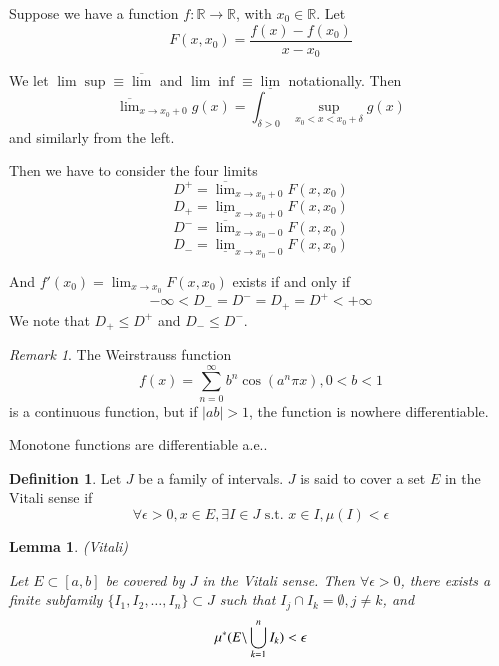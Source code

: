 \documentclass[11pt,a4paper]{report}
\newtheorem{lemma}[theorem]{Lemma}
\theoremstyle{plain}
\theoremstyle{definition}
\newtheorem*{defn}{Definition}
\theoremstyle{remark}
\newtheorem*{rem}{Remark}
\newcommand{\intersection}{\cap}
\newcommand{\Union}{\bigcup}
\newcommand{\R}{\mathbb{R}}
\newcommand{\abs}[1]{\left| #1 \right|}
\begin{document}
Suppose we have a function $f : \R \to \R$, with $x_0 \in \R$. Let
$$ F(x, x_0) = \frac{f(x) - f(x_0)}{x - x_0} $$

\renewcommand{\limsup}{\overline{\lim}}
\renewcommand{\liminf}{\underline{\lim}}

We let $\lim\sup \equiv \limsup$ and $\lim\inf \equiv \liminf$ notationally. Then
$$ \limsup_{x \to x_0 + 0} g(x) = \int_{\delta > 0} \sup_{x_0 < x < x_0 + \delta} g(x) $$
and similarly from the left.

Then we have to consider the four limits
\newcommand{\Dpu}{D^{+}}
\newcommand{\Dpl}{D_{+}}
\newcommand{\Dmu}{D^{-}}
\newcommand{\Dml}{D_{-}}
$$ \Dpu = \limsup_{x \to x_0 + 0} F(x, x_0) $$
$$ \Dpl = \liminf_{x \to x_0 + 0} F(x, x_0) $$
$$ \Dmu = \limsup_{x \to x_0 - 0} F(x, x_0) $$
$$ \Dml = \liminf_{x \to x_0 - 0} F(x, x_0) $$

And $f'(x_0) = \lim_{x \to x_0} F(x, x_0)$ exists if and only if 
$$-\infty < \Dml = \Dmu = \Dpl = \Dpu < +\infty$$
We note that $\Dpl \le \Dpu$ and $\Dml \le \Dmu$.

\begin{rem}
  The Weirstrauss function
    $$ f(x) = \sum_{n = 0}^\infty b^n \cos(a^n \pi x), 0 < b < 1 $$
  is a continuous function, but if $\abs{ab} > 1$, the function is nowhere differentiable.
\end{rem}

Monotone functions are differentiable a.e..

\begin{defn}
  Let $J$ be a family of intervals. $J$ is said to cover a set $E$ in the Vitali sense if
    $$ \forall \epsilon > 0, x \in E, \exists I \in J \text{ s.t. } x \in I, \mu(I) < \epsilon $$
\end{defn}

\begin{lemma}(Vitali)

    Let $E \subset [a, b]$ be covered by $J$ in the Vitali sense. Then $\forall \epsilon > 0$, there exists a finite subfamily  $\{ I_1, I_2, \dots, I_n \} \subset J $ such that $I_j \intersection I_k = \emptyset, j \ne k$, and
    $$ \mustar(E \backslash \Union_{k=1}^n I_k) < \epsilon $$
\end{lemma}
\end{document}
